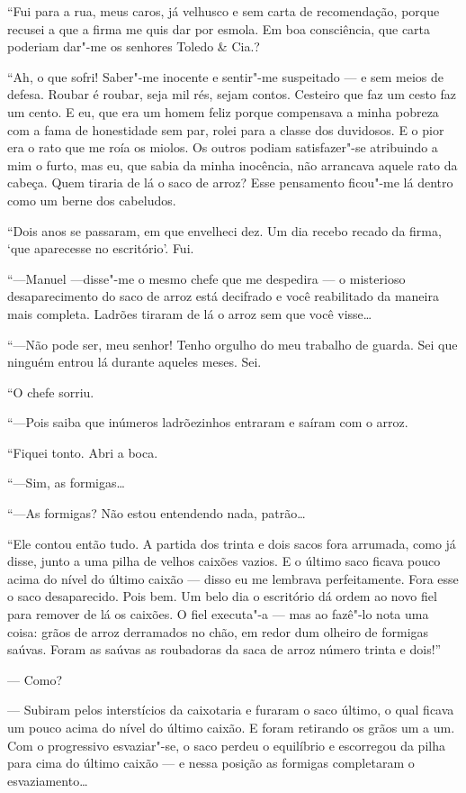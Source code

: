 ``Fui para a rua, meus caros, já velhusco e sem carta de recomendação,
porque recusei a que a firma me quis dar por esmola. Em boa consciência,
que carta poderiam dar"-me os senhores Toledo \& Cia.?

``Ah, o que sofri! Saber"-me inocente e sentir"-me suspeitado --- e sem
meios de defesa. Roubar é roubar, seja mil rés, sejam contos. Cesteiro
que faz um cesto faz um cento. E eu, que era um homem feliz porque
compensava a minha pobreza com a fama de honestidade sem par, rolei para
a classe dos duvidosos. E o pior era o rato que me roía os miolos. Os
outros podiam satisfazer"-se atribuindo a mim o furto, mas eu, que sabia
da minha inocência, não arrancava aquele rato da cabeça. Quem tiraria de
lá o saco de arroz? Esse pensamento ficou"-me lá dentro como um berne dos
cabeludos.

``Dois anos se passaram, em que envelheci dez. Um dia recebo recado da
firma, `que aparecesse no escritório'. Fui.

``---Manuel ---disse"-me o mesmo chefe que me despedira --- o misterioso
desaparecimento do saco de arroz está decifrado e você reabilitado da
maneira mais completa. Ladrões tiraram de lá o arroz sem que você
visse\ldots{}

``---Não pode ser, meu senhor! Tenho orgulho do meu trabalho de guarda.
Sei que ninguém entrou lá durante aqueles meses. Sei.

``O chefe sorriu.

``---Pois saiba que inúmeros ladrõezinhos entraram e saíram com o arroz.

``Fiquei tonto. Abri a boca.

``---Sim, as formigas\ldots{}

``---As formigas? Não estou entendendo nada, patrão\ldots{}

``Ele contou então tudo. A partida dos trinta e dois sacos fora
arrumada, como já disse, junto a uma pilha de velhos caixões vazios. E o
último saco ficava pouco acima do nível do último caixão --- disso eu me
lembrava perfeitamente. Fora esse o saco desaparecido. Pois bem. Um belo
dia o escritório dá ordem ao novo fiel para remover de lá os caixões. O
fiel executa"-a --- mas ao fazê"-lo nota uma coisa: grãos de arroz
derramados no chão, em redor dum olheiro de formigas saúvas. Foram as
saúvas as roubadoras da saca de arroz número trinta e dois!''

--- Como?

--- Subiram pelos interstícios da caixotaria e furaram o saco último, o
qual ficava um pouco acima do nível do último caixão. E foram retirando
os grãos um a um. Com o progressivo esvaziar"-se, o saco perdeu o
equilíbrio e escorregou da pilha para cima do último caixão --- e nessa
posição as formigas completaram o esvaziamento\ldots{}

